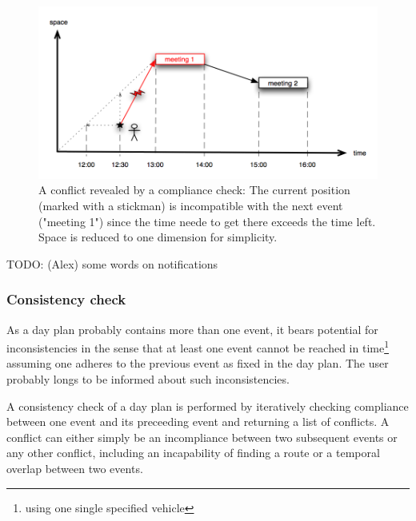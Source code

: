 \begin{figure}[h!]
	\centering
	\includegraphics[width=15cm]{pics/compliance_check.png}
	\caption{A conflict revealed by a compliance check: The current position (marked with a stickman) is incompatible with the next event ("meeting 1") since the time neede to get there exceeds the time left. Space is reduced to one dimension for simplicity.}
	\label{fig:compliance_check}
\end{figure}

TODO: (Alex) some words on notifications

\subsubsection{Consistency check}

As a day plan probably contains more than one event, it bears potential for inconsistencies in the sense that at least one event cannot be reached in time\footnote{using one single specified vehicle} assuming one adheres to the previous event as fixed in the day plan. The user probably longs to be informed about such inconsistencies.\newline

A consistency check of a day plan is performed by iteratively checking compliance between one event and its preceeding event and returning a list of conflicts. A conflict can either simply be an incompliance between two subsequent events or any other conflict, including an incapability of finding a route or a temporal overlap between two events.











